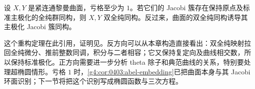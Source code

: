 \begin{theorem}[经典 Torelli 定理]
	\label{g4:thm:0404:torelli}
	设 \(X,Y\) 是紧连通黎曼曲面，亏格至少为 \(1\)。若它们的 Jacobi 簇存在保持原点及标准主极化的全纯群同构，则 \(X,Y\) 双全纯同构。反过来，曲面的双全纯同构诱导其主极化 Jacobi 簇同构。
\end{theorem}

这个重构定理在此引用，证明见\cite[第2章第7节，第359--362页，Torelli's Theorem]{GriffithsHarris1994}。反方向可以从本章构造直接看出：双全纯映射拉回全纯微分、推前整数同调，积分与二者相容；它又保持复定向及曲线相交数，所以保持标准极化。正方向需要进一步分析 theta 除子和典范曲线的关系，特别要处理超椭圆情形。亏格 \(1\) 时，\cref{g4:cor:0403:abel-embedding}已把曲面本身与其 Jacobi 环面识别；下一节将把这个识别写成椭圆函数与三次方程。
